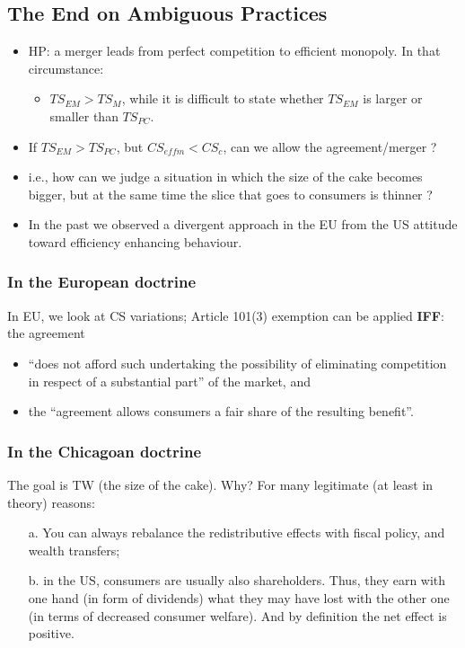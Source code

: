 
    \subsection{The End on Ambiguous Practices}

        \begin{itemize}
            \item HP: a merger leads from perfect competition to efficient monopoly. In that circumstance:
                \begin{itemize}
                    \item $TS_{EM} > TS_{M}$, while it is difficult to state whether $TS_{EM}$ is larger or smaller than $TS_{PC}$.
                \end{itemize}
            \item If $TS_{EM} > TS_{PC}$, but $CS_{effm} < CS_c$, can we allow the agreement/merger ?
            \item i.e., how can we judge a situation in which the size of the cake becomes bigger, but at the same time the slice that goes to consumers is thinner ?
            \item In the past we observed a divergent approach in the EU from the US attitude toward efficiency enhancing behaviour.
        \end{itemize}

        \subsubsection{In the European doctrine}

            In EU, we look at CS variations; Article 101(3) exemption can be applied \textbf{IFF}: the agreement
                \begin{itemize}
                    \item “does not afford such undertaking the possibility of eliminating competition in respect of a substantial part” of the market, and
                    \item the “agreement allows consumers a fair share of the resulting benefit”.
                \end{itemize}

        \subsubsection{In the Chicagoan doctrine}

            The goal is TW (the size of the cake). Why? For many legitimate (at least in theory) reasons:
                \begin{itemize}
                    \item[a.] You can always rebalance the redistributive effects with fiscal policy, and wealth transfers;
                    \item[b.] in the US, consumers are usually also shareholders. Thus, they earn with one hand (in form of dividends) what they may have lost with the other one (in terms of decreased consumer welfare). And by definition the net effect is positive.
                \end{itemize}
